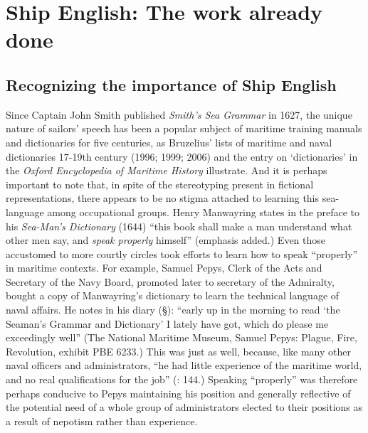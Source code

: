 \section{{Ship} {English:} {The} {work} {already} {done}}%

\subsection{{Recognizing} {the} {importance} {of} {Ship} {English}}%

Since Captain John Smith published \textit{Smith’s Sea Grammar} in 1627, the unique nature of sailors’ speech has been a popular subject of maritime training manuals and dictionaries for five centuries, as Bruzelius’ lists of maritime and naval dictionaries 17-19th century (1996; 1999; 2006) and the entry on ‘dictionaries’ in the \textit{Oxford Encyclopedia of Maritime History} \citep{Hattendorf2007} illustrate. And it is perhaps important to note that, in spite of the stereotyping present in fictional representations, there appears to be no stigma attached to learning this sea-language among occupational groups. Henry Manwayring states in the preface to his \textit{Sea-Man’s Dictionary} (1644) “this book shall make a man understand what other men say, and \textit{speak properly} himself” (emphasis added.) Even those accustomed to more courtly circles took efforts to learn how to speak “properly” in maritime contexts. For example, Samuel Pepys, Clerk of the Acts and Secretary of the Navy Board, promoted later to secretary of the Admiralty, bought a copy of Manwayring’s dictionary to learn the technical language of naval affairs. He notes in his diary (§\citealt{March1661}): “early up in the morning to read ‘the Seaman’s Grammar and Dictionary’ I lately have got, which do please me exceedingly well” (The National Maritime Museum, Samuel Pepys: Plague, Fire, Revolution, exhibit PBE 6233.)  This was just as well, because, like many other naval officers and administrators, “he had little experience of the maritime world, and no real qualifications for the job” (\citealt{Lincoln2015}: 144.) Speaking “properly” was therefore perhaps conducive to Pepys maintaining his position and generally reflective of the potential need of a whole group of administrators elected to their positions as a result of nepotism rather than experience. 

